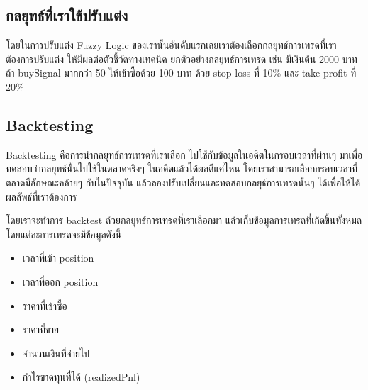 \subsection{กลยุทธ์ที่เราใช้ปรับแต่ง}
โดยในการปรับแต่ง Fuzzy Logic ของเรานั้นอันดับแรกเลยเราต้องเลือกกลยุทธ์การเทรดที่เราต้องการปรับแต่ง ให้มีผลต่อตัวชี้วัดทางเทคนิค ยกตัวอย่างกลยุทธ์การเทรด
เช่น มีเงินต้น 2000 บาท ถ้า buySignal มากกว่า 50 ให้เข้าซื้อด้วย 100 บาท ด้วย stop-loss ที่ 10\% และ take profit ที่ 20\% 
\subsection{Backtesting}
Backtesting คือการนำกลยุทธ์การเทรดที่เราเลือก ไปใช้กับข้อมูลในอดีตในกรอบเวลาที่ผ่านๆ มาเพื่อทดสอบว่ากลยุทธ์นั้นไปใช้ในตลาดจริงๆ ในอดีตแล้วได้ผลดีแค่ไหน
โดยเราสามารถเลือกกรอบเวลาที่ตลาดมีลักษณะคล้ายๆ กับในปัจจุบัน แล้วลองปรับเปลี่ยนและทดสอบกลยุธ์การเทรดนั้นๆ ได้เพื่อให้ได้ผลลัพธ์ที่เราต้องการ

โดยเราจะทำการ backtest ด้วยกลยุทธ์การเทรดที่เราเลือกมา แล้วเก็บข้อมูลการเทรดที่เกิดขึ้นทั้งหมดโดยแต่ละการเทรดจะมีข้อมูลดังนี้ 
\begin{itemize}
    \item เวลาที่เข้า position
    \item เวลาที่ออก position
    \item ราคาที่เข้าซื้อ
    \item ราคาที่ขาย
    \item จำนวนเงินที่จ่ายไป
    \item กำไรขาดทุนที่ได้ ($\text{realizedPnl}$)
\end{itemize}

